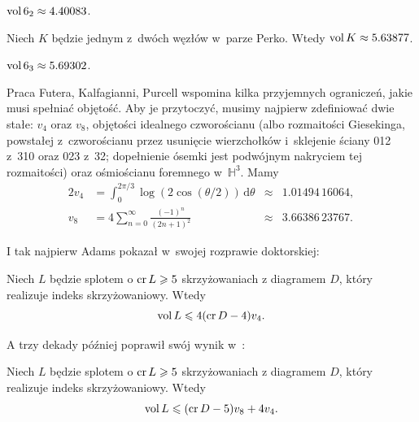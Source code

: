\begin{example}
    $\operatorname{vol} 6_2 \approx 4.40083$.
\end{example}

\begin{example}
%
    Niech $K$ będzie jednym z~dwóch węzłów w~parze Perko.
    Wtedy $\operatorname{vol} K \approx 5.63877$.
\end{example}

\begin{example}
    $\operatorname{vol} 6_3 \approx 5.69302$.
\end{example}

Praca Futera, Kalfagianni, Purcell \cite{purcell2019} wspomina kilka przyjemnych ograniczeń, jakie musi spełniać objętość.
%
%
%
Aby je przytoczyć, musimy najpierw zdefiniować dwie stałe: $v_4$ oraz $v_8$, objętości idealnego czworościanu (albo rozmaitości Giesekinga, powstałej z~czworościanu przez usunięcie wierzchołków i~sklejenie ściany 012 z~310 oraz 023 z~32; dopełnienie ósemki jest podwójnym nakryciem tej rozmaitości) oraz ośmiościanu foremnego w~$\mathbb H^3$.
%
Mamy
\begin{alignat}{2}
    v_4 & = \int_{0}^{2\pi/3} \log(2 \cos(\theta/2)) \,\mathrm{d}\theta & {}\approx{} & 1.01494\,16064, \\
    v_8 & = 4 \sum_{n=0}^\infty \frac{(-1)^n}{(2n+1)^2} &{}\approx{}& 3.66386\,23767.
\end{alignat}

I tak najpierw Adams \cite{adams1983} pokazał w~swojej rozprawie doktorskiej:
%

\begin{proposition}
    Niech $L$ będzie splotem o $\operatorname{cr} L \geqslant 5$ skrzyżowaniach z diagramem $D$, który realizuje indeks skrzyżowaniowy.
    Wtedy
    \begin{equation}
        \operatorname{vol} L \leqslant 4 (\operatorname{cr} D - 4) v_4.
    \end{equation}
\end{proposition}

A trzy dekady później poprawił swój wynik w~\cite{adams2013}:

\begin{proposition}
    Niech $L$ będzie splotem o $\operatorname{cr} L \geqslant 5$ skrzyżowaniach z diagramem $D$, który realizuje indeks skrzyżowaniowy.
    Wtedy
    \begin{equation}
        \operatorname{vol} L \leqslant (\operatorname{cr} D - 5) v_8 + 4v_4.
    \end{equation}
\end{proposition}

